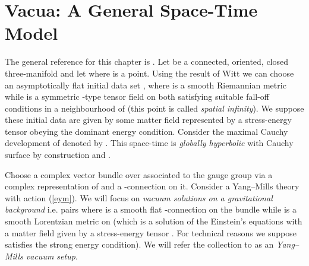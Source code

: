 \documentclass[a4paper,12pt,draft]{article}
\providecommand{\R}{{\mathbb R}}
\begin{document}
\section{Vacua: A General Space-Time Model}
The general reference for this chapter is \cite{wal}. Let \coordHE{} be
a connected, oriented, closed three-manifold and let
\coordHE{} where
\coordHE{} is a point. Using the result of Witt \cite{wit} we
can choose an asymptotically flat initial data set
\coordHE{}, where \coordHE{} is a smooth Riemannian metric while \coordHE{} is a
symmetric \coordHE{}-type tensor field on \coordHE{} both satisfying suitable
fall-off conditions in a neighbourhood of \coordHE{} (this point is called {\it
spatial infinity}). We suppose these initial data are given by some matter
field represented by a stress-energy tensor \coordHE{} obeying the
dominant energy condition. Consider the maximal Cauchy development of 
\coordHE{} denoted by \coordHE{}. This space-time is {\it globally
hyperbolic} with Cauchy surface \coordHE{} by construction and \myHighlight{$M\cong
S\times\R$}\coordHE{}. 

Choose a complex vector bundle \coordHE{}
over \coordHE{} associated to the gauge group \coordHE{} via a complex representation 
of \coordHE{} and a \coordHE{}-connection \coordHE{} on it.
Consider a Yang--Mills theory with action (\ref{eym}). We will focus on
{\it vacuum solutions on a gravitational background} i.e.
pairs \coordHE{} where \coordHE{} is a smooth flat \coordHE{}-connection on the bundle \coordHE{}
while \coordHE{} is a smooth Lorentzian metric on \coordHE{} (which is a solution of the
Einstein's equations with a matter field given by a stress-energy tensor
\coordHE{}. For technical reasons we suppose \coordHE{} satisfies the strong
energy condition). We will refer the collection \coordHE{} to as an
{\it Yang--Mills vacuum setup}.
\end{document}
